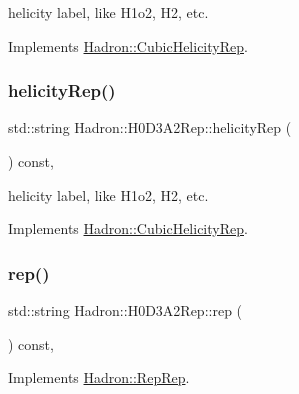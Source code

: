 helicity label, like H1o2, H2, etc. 

Implements \mbox{\hyperlink{structHadron_1_1CubicHelicityRep_af1096946b7470edf0a55451cc662f231}{Hadron\+::\+Cubic\+Helicity\+Rep}}.

\mbox{\label{structHadron_1_1H0D3A2Rep_aed7cbc2156d185f430ce0ce0a4c29f54}} 
\subsubsection{\texorpdfstring{helicityRep()}{helicityRep()}\hspace{0.1cm}{\footnotesize\ttfamily [2/2]}}
{\footnotesize\ttfamily std\+::string Hadron\+::\+H0\+D3\+A2\+Rep\+::helicity\+Rep (\begin{DoxyParamCaption}{ }\end{DoxyParamCaption}) const\hspace{0.3cm}{\ttfamily [inline]}, {\ttfamily [virtual]}}

helicity label, like H1o2, H2, etc. 

Implements \mbox{\hyperlink{structHadron_1_1CubicHelicityRep_af1096946b7470edf0a55451cc662f231}{Hadron\+::\+Cubic\+Helicity\+Rep}}.

\mbox{\label{structHadron_1_1H0D3A2Rep_a11e300b7b2215df67123d3d9e8747cb6}} 
\subsubsection{\texorpdfstring{rep()}{rep()}\hspace{0.1cm}{\footnotesize\ttfamily [1/3]}}
{\footnotesize\ttfamily std\+::string Hadron\+::\+H0\+D3\+A2\+Rep\+::rep (\begin{DoxyParamCaption}{ }\end{DoxyParamCaption}) const\hspace{0.3cm}{\ttfamily [inline]}, {\ttfamily [virtual]}}



Implements \mbox{\hyperlink{structHadron_1_1RepRep_ab3213025f6de249f7095892109575fde}{Hadron\+::\+Rep\+Rep}}.

\mbox{\label{structHadron_1_1H0D3A2Rep_a11e300b7b2215df67123d3d9e8747cb6}} 
